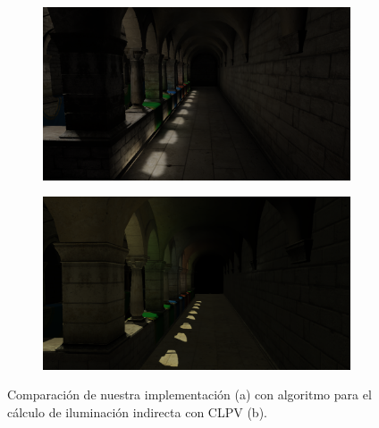 \begin{figure}[H]
	\centering
	\begin{subfigure}[b]{0.49\linewidth}
		\centering
		\captionsetup{justification=centering}
		\includegraphics[width=\linewidth]{media/vct.png}
		\caption{}
	\end{subfigure}%
	\hspace{0.01\textwidth}
	\begin{subfigure}[b]{0.49\linewidth}
		\centering
		\captionsetup{justification=centering}
		\includegraphics[width=\linewidth]{media/lpv.png}
		\caption{}
	\end{subfigure}%
	\caption{Comparación de nuestra implementación (a) con algoritmo para el cálculo de iluminación indirecta con \acl{CLPV} (b).}
	\label{fig:comp_quality}
\end{figure}

